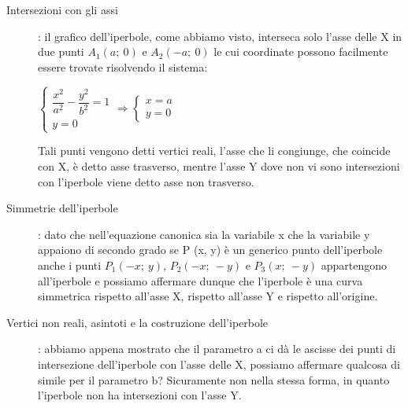 \begin{description}
\item [Intersezioni con gli assi]: il grafico dell'iperbole, 
come abbiamo visto, interseca solo l'asse delle X in due punti $ A_{1} 
(a;~0)$ e $ A_{2}(-a;~0)$ le cui coordinate possono facilmente essere 
trovate risolvendo il sistema:

\centerline{$\begin{cases}  \dfrac{x^{2}}{a^{2}}-\dfrac{y^{2}}{b^{2}}=1   
\\ y =0  
  \end{cases} \Rightarrow \begin{cases}  x=a  \\ y=0
  \end{cases}$}

Tali punti vengono detti vertici reali, l'asse che li congiunge, che 
coincide con X, è detto asse trasverso, mentre l'asse Y dove non vi sono 
intersezioni con l'iperbole viene detto asse non trasverso.\\
\item [Simmetrie dell'iperbole]: dato che nell'equazione canonica sia 
la variabile x che la variabile y appaiono di secondo grado se P (x, y) è 
un generico punto dell'iperbole anche i punti $ P_{1}(-x;~y)$,     $ 
P_{2}(-x;~-y)$ e $ P_{3}(x;~-y)$ appartengono all'iperbole e possiamo 
affermare dunque che l'iperbole è una curva simmetrica rispetto all'asse X, 
rispetto all'asse Y e rispetto all'origine.\\
\item [Vertici non reali, asintoti e la costruzione dell'iperbole]:
 abbiamo appena mostrato che il parametro a ci dà le ascisse dei  punti di 
intersezione dell'iperbole con l'asse delle X, possiamo affermare qualcosa 
di simile per il parametro b? Sicuramente non nella stessa forma, in quanto 
l'iperbole non ha intersezioni con l'asse Y. 


\end{description}
